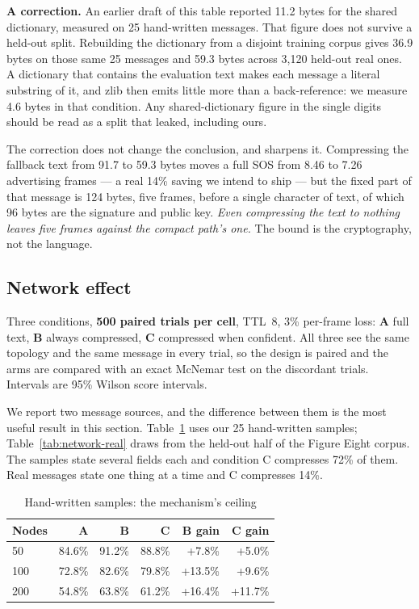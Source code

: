 \documentclass[conference]{IEEEtran}
\begin{document}
\textbf{A correction.} An earlier draft of this table reported 11.2 bytes for
the shared dictionary, measured on 25 hand-written messages. That figure does
not survive a held-out split. Rebuilding the dictionary from a disjoint
training corpus gives 36.9 bytes on those same 25 messages and 59.3 bytes
across 3{,}120 held-out real ones. A dictionary that contains the evaluation
text makes each message a literal substring of it, and zlib then emits little
more than a back-reference: we measure 4.6 bytes in that condition. Any
shared-dictionary figure in the single digits should be read as a split that
leaked, including ours.

The correction does not change the conclusion, and sharpens it. Compressing
the fallback text from 91.7 to 59.3 bytes moves a full SOS from 8.46 to 7.26
advertising frames --- a real 14\% saving we intend to ship --- but the fixed
part of that message is 124 bytes, five frames, before a single character of
text, of which 96 bytes are the signature and public key. \emph{Even
compressing the text to nothing leaves five frames against the compact path's
one.} The bound is the cryptography, not the language.

\subsection{Network effect}
Three conditions, \textbf{500 paired trials per cell}, TTL~8, 3\% per-frame
loss: \textbf{A} full text, \textbf{B} always compressed, \textbf{C}
compressed when confident. All three see the same topology and the same
message in every trial, so the design is paired and the arms are compared
with an exact McNemar test on the discordant trials. Intervals are 95\%
Wilson score intervals.

We report two message sources, and the difference between them is the most
useful result in this section. Table~\ref{tab:network} uses our 25
hand-written samples; Table~\ref{tab:network-real} draws from the held-out
half of the Figure Eight corpus. The samples state several fields each and
condition C compresses 72\% of them. Real messages state one thing at a
time and C compresses 14\%.

\begin{table}[htbp]
\caption{Hand-written samples: the mechanism's ceiling}
\begin{center}
\begin{tabular}{lrrrrr}
\toprule
\textbf{Nodes} & \textbf{A} & \textbf{B} & \textbf{C} & \textbf{B gain} & \textbf{C gain} \\
\midrule
50 & 84.6\% & 91.2\% & 88.8\% & +7.8\% & +5.0\% \\
100 & 72.8\% & 82.6\% & 79.8\% & +13.5\% & +9.6\% \\
200 & 54.8\% & 63.8\% & 61.2\% & +16.4\% & +11.7\% \\
\bottomrule
\end{tabular}
\label{tab:network}
\end{center}
\end{table}
\end{document}
